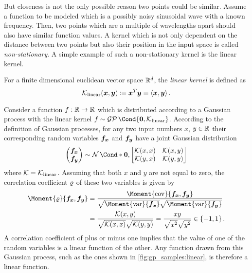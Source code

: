 But closeness is not the only possible reason two points could be similar.
Assume a function to be modeled which is a possibly noisy sinusoidal wave with a known frequency.
Then, two points which are a multiple of wavelengths apart should also have similar function values.
A kernel which is not only dependent on the distance between two points but also their position in the input space is called \emph{non-stationary}.
A simple example of such a non-stationary kernel is the linear kernel.
\begin{definition}
    For a finite dimensional euclidean vector space $\mathbb{R}^d$, the \emph{linear kernel} is defined as
    \begin{align}
        \operatorname{\mathcal{K}}_{\text{linear}}(\bm{x}, \bm{y}) \coloneqq \bm{x}^T \bm{y} = \left\langle \bm{x}, \bm{y}\right\rangle.
    \end{align}
\end{definition}
Consider a function $f : \mathbb{R} \to \mathbb{R}$ which is distributed according to a Gaussian process with the linear kernel $f \sim \GP\Cond{\mat{0}, \K_{\text{linear}}}$.
According to the definition of Gaussian processes, for any two input numbers $x$, $y \in \mathbb{R}$ their corresponding random variables $\bm{f_x}$ and $\bm{f_y}$ have a joint Gaussian distribution
\begin{align}
    \begin{pmatrix}
        \rv{f_x} \\ \rv{f_y}
    \end{pmatrix} \sim \Gaussian*{\mat{0}, \begin{bmatrix}
        \K(x, x) & \K(x, y) \\
        \K(y, x) & \K(y, y)
    \end{bmatrix}}
\end{align}
where $\operatorname{\mathcal{K}} = \operatorname{\mathcal{K}}_{\text{linear}}$.
Assuming that both $x$ and $y$ are not equal to zero, the correlation coefficient $\corr$ of these two variables is given by
\begin{align}
    \Moment{\corr}{\rv{f_x}, \rv{f_y}} &= \frac{\Moment{\cov}{\rv{f_x}, \rv{f_y}}}{\sqrt{\Moment{\var}{\rv{f_x}\vphantom{\rv{f_y}}}}\sqrt{\Moment{\var}{\rv{f_y}}}} \\
    &= \frac{\K(x, y)}{\sqrt{\K(x, x)} \sqrt{\K(y, y)}} = \frac{xy}{\sqrt{\vphantom{y^2}x^2}\sqrt{\vphantom{y^2}y^2}} \in \left\{ -1, 1 \right\}.
\end{align}
A correlation coefficient of plus or minus one implies that the value of one of the random variables is a linear function of the other.
Any function drawn from this Gaussian process, such as the ones shown in \cref{fig:gp_samples:linear}, is therefore a linear function.
